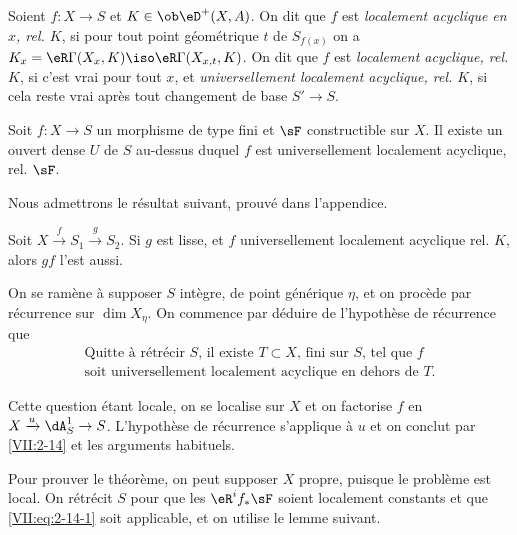 \begin{definition_}\label{VII:2-12}
Soient $f:X\to S$ et $K\in \ob\eD^+(X,A)$. On dit que $f$ est \emph{localement 
acyclique en $x$, rel. $K$}, si pour tout point géométrique $t$ de 
$S_{f(x)}$ on a $K_x=\eR\Gamma(X_x,K)\iso \eR\Gamma(X_{x,t},K)$. On dit que $f$ 
est \emph{localement acyclique, rel. $K$}, si c'est vrai pour tout $x$, et 
\emph{universellement localement acyclique, rel. $K$}, si cela reste vrai 
après tout changement de base $S' \to S$.
\end{definition_}





\begin{theorem_}\label{VII:2-13}
Soit $f:X\to S$ un morphisme de type fini et $\sF$ constructible sur $X$. Il 
existe un ouvert dense $U$ de $S$ au-dessus duquel $f$ est universellement 
localement acyclique, rel. $\sF$. 
\end{theorem_}

Nous admettrons le résultat suivant, prouvé dans l'appendice. 





\begin{lemma_}\label{VII:2-14}
Soit $X\xrightarrow f S_1 \xrightarrow g S_2$. Si $g$ est lisse, et $f$ 
universellement localement acyclique rel. $K$, alors $g f$ l'est aussi. 
\end{lemma_}

On se ramène à supposer $S$ intègre, de point générique $\eta$, et 
on procède par récurrence sur $\dim{X_\eta}$. On commence par déduire de 
l'hypothèse de récurrence que 
\begin{equation*}\tag{A}\label{VII:eq:2-14-1}
  \begin{array}{c}
    \text{Quitte à rétrécir $S$, il existe $T\subset X$, fini sur $S$, tel que $f$} \\
    \text{soit universellement localement acyclique en dehors de $T$.} 
  \end{array}
\end{equation*}

Cette question étant locale, on se localise sur $X$ et on factorise $f$ en 
$X\xrightarrow u \dA_S^1 \to S$. L'hypothèse de récurrence 
s'applique à $u$ et on conclut par \ref{VII:2-14} et les arguments habituels. 

Pour prouver le théorème, on peut supposer $X$ propre, puisque le 
problème est local. On rétrécit $S$ pour que les $\eR^i f_\ast \sF$ 
soient localement constants et que \eqref{VII:eq:2-14-1} soit applicable, et on 
utilise le lemme suivant. 





